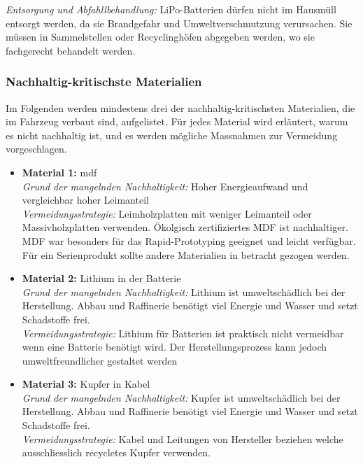 \textit{Entsorgung und Abfahllbehandlung:} LiPo-Batterien dürfen nicht im Hausmüll entsorgt
werden, da sie Brandgefahr und Umweltverschmutzung verursachen. Sie müssen in Sammelstellen oder Recyclinghöfen abgegeben werden, wo sie fachgerecht behandelt werden.


\subsubsection{Nachhaltig-kritischste Materialien}
Im Folgenden werden mindestens drei der nachhaltig-kritischsten Materialien, die im Fahrzeug verbaut sind, aufgelistet. Für jedes Material wird erläutert, warum es nicht nachhaltig ist, und es werden mögliche Massnahmen zur Vermeidung vorgeschlagen.

\begin{itemize}
    \item \textbf{Material 1:} \acrfull{mdf} \\
          \textit{Grund der mangelnden Nachhaltigkeit:} Hoher Energieaufwand und vergleichbar hoher Leimanteil  \\
          \textit{Vermeidungsstrategie:} Leimholzplatten mit weniger Leimanteil oder Massivholzplatten verwenden. Ökolgisch zertifiziertes MDF ist nachhaltiger. MDF war besonders für das Rapid-Prototyping geeignet und leicht verfügbar. Für ein Serienprodukt sollte andere Materialien in betracht gezogen werden.
          
    \item \textbf{Material 2:} Lithium in der Batterie \\
          \textit{Grund der mangelnden Nachhaltigkeit:} Lithium ist umweltschädlich bei der Herstellung. Abbau und Raffinerie benötigt viel Energie und Wasser und setzt Schadstoffe frei. \\
          \textit{Vermeidungsstrategie:} Lithium für Batterien ist praktisch nicht vermeidbar wenn eine Batterie benötigt wird. Der Herstellungsprozess kann jedoch umweltfreundlicher gestaltet werden
          
    \item \textbf{Material 3:} Kupfer in Kabel \\
          \textit{Grund der mangelnden Nachhaltigkeit:} Kupfer ist umweltschädlich bei der Herstellung. Abbau und Raffinerie benötigt viel Energie und Wasser und setzt Schadstoffe frei. \\
          \textit{Vermeidungsstrategie:} Kabel und Leitungen von Hersteller beziehen welche ausschliesslich recycletes Kupfer verwenden.
\end{itemize}

